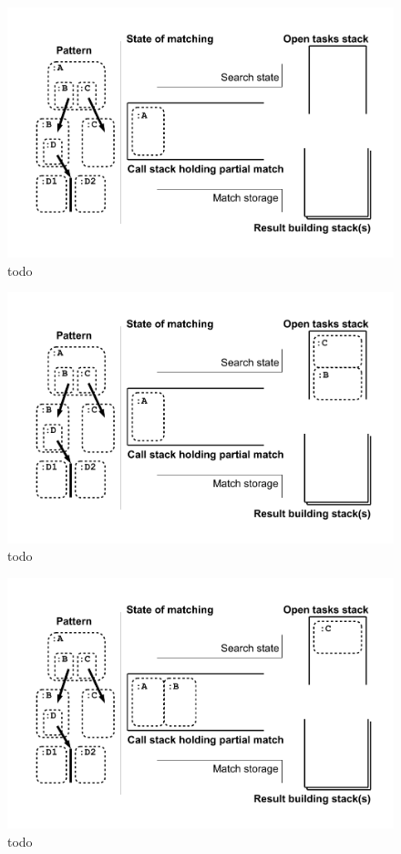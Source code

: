\begin{figure}[htbp]
  \centering
  \includegraphics[width=\textwidth]{fig/Passungszustand2}
  \caption{todo}
  \label{figmatchingstate2}
\end{figure}

\begin{figure}[htbp]
  \centering
  \includegraphics[width=\textwidth]{fig/Passungszustand3}
  \caption{todo}
  \label{figmatchingstate3}
\end{figure}

\begin{figure}[htbp]
  \centering
  \includegraphics[width=\textwidth]{fig/Passungszustand4}
  \caption{todo}
  \label{figmatchingstate4}
\end{figure}

